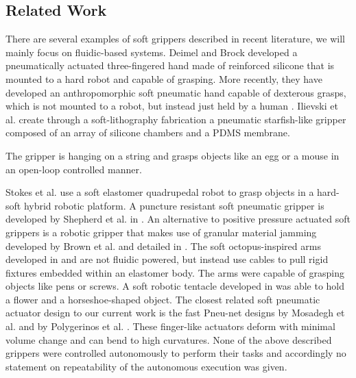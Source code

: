 \subsection{Related Work}
There are  several examples of soft grippers described in recent literature, we will mainly focus on fluidic-based systems.
Deimel and Brock \cite{deimel2013compliant} developed a pneumatically actuated three-fingered hand made of reinforced silicone that is mounted to a hard robot and capable of grasping.
More recently, they have developed an anthropomorphic soft pneumatic hand capable of dexterous grasps, which is not mounted to a robot, but instead just held by a human \cite{deimel2014novel}. 
Ilievski et al. \cite{ilievski2011soft} create through a soft-lithography fabrication a pneumatic starfish-like gripper composed of an array of silicone chambers and a PDMS membrane. 

The gripper is hanging on a string and grasps objects like an egg or a mouse in an open-loop controlled manner.
 
Stokes et al. \cite{Stokes2014hybrid} use a soft elastomer quadrupedal robot to grasp objects in a hard-soft hybrid robotic platform. 
A puncture resistant soft pneumatic gripper is developed by Shepherd et al. in \cite{shepherd2013soft}. 
An alternative to positive pressure actuated soft grippers is a robotic gripper that makes use of granular material jamming developed by Brown et al. and detailed in \cite{brown2010universal}.
The soft octopus-inspired arms developed in \cite{calisti2010study} and \cite{calisti2011octopus} are not fluidic powered, but instead use cables to pull rigid fixtures embedded within an elastomer body. 
The arms were capable of grasping objects like pens or screws.
A soft robotic tentacle developed in \cite{martinez2013robotic} was able to hold a flower and a horseshoe-shaped object.
The closest related soft pneumatic actuator design to our current work is the fast Pneu-net designs by Mosadegh et al. \cite{mosadegh2014pneumatic} and by Polygerinos et al. \cite{polygerinos2013towards}.
These finger-like actuators deform with minimal volume change and can bend to high curvatures.
None of the above described grippers were controlled autonomously to perform their tasks and accordingly no statement on repeatability of the autonomous execution was given. 

